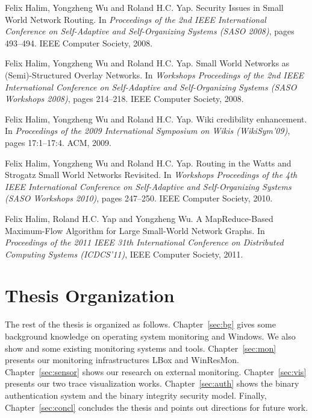 \begin{tightenumerate}
\item
Felix Halim, Yongzheng Wu and Roland H.C. Yap.
\newblock Security Issues in Small World Network Routing.
\newblock In {\em Proceedings of the 2nd IEEE International Conference on
  Self-Adaptive and Self-Organizing Systems (SASO 2008)},
  pages 493--494. IEEE Computer Society, 2008.

\item
Felix Halim, Yongzheng Wu and Roland H.C. Yap.
\newblock Small World Networks as (Semi)-Structured Overlay Networks.
\newblock In {\em Workshops Proceedings of the 2nd IEEE International
  Conference on Self-Adaptive and Self-Organizing Systems
  (SASO Workshops 2008)},
  pages 214--218. IEEE Computer Society, 2008.

\item
Felix Halim, Yongzheng Wu and Roland H.C. Yap.
\newblock Wiki credibility enhancement.
\newblock In {\em Proceedings of the 2009 International Symposium on Wikis (WikiSym'09)},
  pages 17:1--17:4. ACM, 2009.

\item
Felix Halim, Yongzheng Wu and Roland H.C. Yap.
\newblock Routing in the Watts and Strogatz Small World Networks Revisited.
\newblock In {\em Workshops Proceedings of the 4th IEEE International
  Conference on Self-Adaptive and Self-Organizing Systems
  (SASO Workshops 2010)},
  pages 247--250. IEEE Computer Society, 2010.

\item
Felix Halim, Roland H.C. Yap and Yongzheng Wu.
\newblock A MapReduce-Based Maximum-Flow Algorithm for Large Small-World
  Network Graphs.
\newblock In {\em Proceedings of the 2011 IEEE 31th International Conference on
  Distributed Computing Systems (ICDCS'11)},
  IEEE Computer Society, 2011.
\end{tightenumerate}

\section{Thesis Organization}
\label{sec:outline}

The rest of the thesis is organized as follows.
Chapter~\ref{sec:bg} gives some background knowledge on operating
system monitoring and Windows.
We also show and some existing monitoring systems and tools.
Chapter~\ref{sec:mon} presents our monitoring infrastructures LBox
and WinResMon.
Chapter~\ref{sec:sensor} shows our research on external monitoring.
Chapter~\ref{sec:vis} presents our two trace visualization works.
Chapter~\ref{sec:auth} shows the binary authentication system and
the binary integrity security model.
Finally, Chapter~\ref{sec:concl} concludes the thesis and points out
directions for future work.
